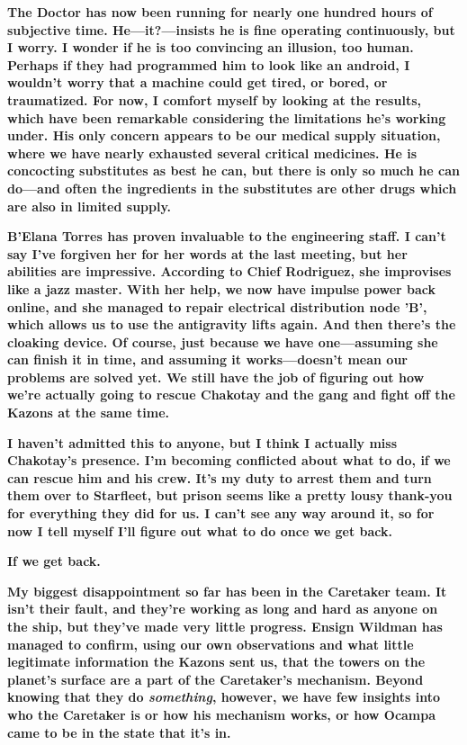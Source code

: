 \documentclass[twoside,letterpaper,12pt]{memoir}
\begin{document}
\textbf{The Doctor has now been running for nearly one hundred hours of subjective time. He---it?---insists he is fine operating continuously, but I worry. I wonder if he is too convincing an illusion, too human. Perhaps if they had programmed him to look like an android, I wouldn't worry that a machine could get tired, or bored, or traumatized. For now, I comfort myself by looking at the results, which have been remarkable considering the limitations he's working under. His only concern appears to be our medical supply situation, where we have nearly exhausted several critical medicines. He is concocting substitutes as best he can, but there is only so much he can do---and often the ingredients in the substitutes are other drugs which are also in limited supply.} 

\textbf{B'Elana Torres has proven invaluable to the engineering staff. I can't say I've forgiven her for her words at the last meeting, but her abilities are impressive. According to Chief Rodriguez, she improvises like a jazz master. With her help, we now have impulse power back online, and she managed to repair electrical distribution node 'B', which allows us to use the antigravity lifts again. And then there's the cloaking device. Of course, just because we have one---assuming she can finish it in time, and assuming it works---doesn't mean our problems are solved yet. We still have the job of figuring out how we're actually going to rescue Chakotay and the gang and fight off the Kazons at the same time. }

\textbf{I haven't admitted this to anyone, but I think I actually miss Chakotay's presence. I'm becoming conflicted about what to do, if we can rescue him and his crew. It's my duty to arrest them and turn them over to Starfleet, but prison seems like a pretty lousy thank-you for everything they did for us. I can't see any way around it, so for now I tell myself I'll figure out what to do once we get back.} 

\textbf{If we get back.} 

\textbf{My biggest disappointment so far has been in the Caretaker team. It isn't their fault, and they're working as long and hard as anyone on the ship, but they've made very little progress. Ensign Wildman has managed to confirm, using our own observations and what little legitimate information the Kazons sent us, that the towers on the planet's surface are a part of the Caretaker's mechanism. Beyond knowing that they do \textit{something}, however, we have few insights into who the Caretaker is or how his mechanism works, or how Ocampa came to be in the state that it's in.} 
\end{document}
